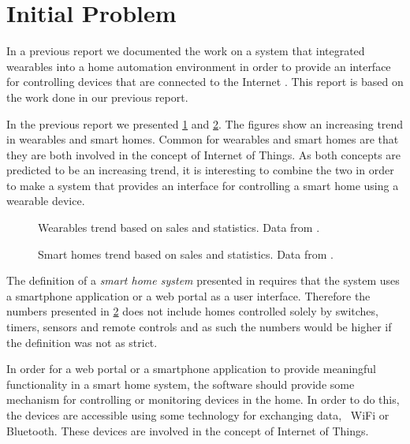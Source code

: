 \section{Initial Problem}
\label{sec:initproblem}

In a previous report we documented the work on a system that integrated wearables into a home automation environment in order to provide an interface for controlling devices that are connected to the Internet \cite{prespecialisation}. This report is based on the work done in our previous report.

In the previous report \cite[pp. 1-4]{prespecialisation} we presented \cref{fig:wearables-trend} and \cref{fig:smarthomestrend}. The figures show an increasing trend in wearables and smart homes. Common for wearables and smart homes are that they are both involved in the concept of Internet of Things. As both concepts are predicted to be an increasing trend, it is interesting to combine the two in order to make a system that provides an interface for controlling a smart home using a wearable device.

\begin{figure}[!hbt]
  \centering
  
  \caption{Wearables trend based on sales and statistics. Data from \protect\cite{WEARABLESTRENDNUMBERS}.}
  \label{fig:wearables-trend}
\end{figure}

\begin{figure}[!hbt]
  \centering
  
  \caption{Smart homes trend based on sales and statistics. Data from \protect\cite{SMARTHOMETREND}.}
  \label{fig:smarthomestrend}
\end{figure}

The definition of a \emph{smart home system} presented in \cite{SMARTHOMETREND} requires that the system uses a smartphone application or a web portal as a user interface. Therefore the numbers presented in \cref{fig:smarthomestrend} does not include homes controlled solely by switches, timers, sensors and remote controls and as such the numbers would be higher if the definition was not as strict.

In order for a web portal or a smartphone application to provide meaningful functionality in a smart home system, the software should provide some mechanism for controlling or monitoring devices in the home. In order to do this, the devices are accessible using some technology for exchanging data, \eg~WiFi or Bluetooth. These devices are involved in the concept of Internet of Things. 

